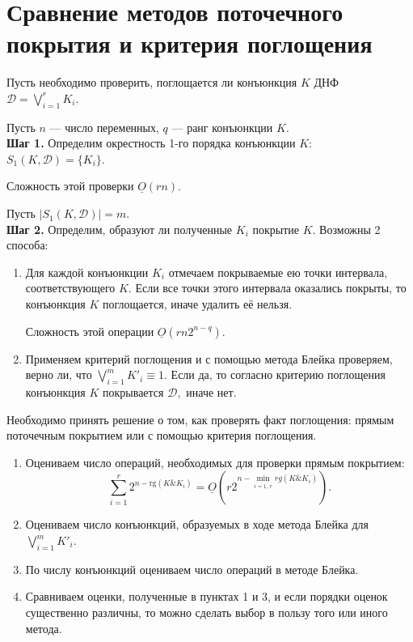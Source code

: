 \documentclass[12pt,a4paper,oneside,fleqn,leqno]{article}
\theoremstyle{definition}
\begin{document}
\section{Сравнение методов поточечного покрытия и критерия поглощения}
		Пусть необходимо проверить, поглощается ли конъюнкция $K$ ДНФ $\mathcal{D} = \bigvee\limits_{i = 1}^r K_i.$\par
		Пусть $n$ --- число переменных, $q$ --- ранг конъюнкции $K.$\\
		\textbf{Шаг 1.} Определим окрестность 1-го порядка конъюнкции $K$: $S_1(K, \mathcal{D}) = \{K_i\}.$\par
		Сложность этой проверки $\underline{O}(rn).$\par
		Пусть $|S_1(K, \mathcal{D})| = m$.\\
		\textbf{Шаг 2.} Определим, образуют ли полученные $K_i$ покрытие $K.$ Возможны 2 способа:\par
		\begin{enumerate}
			\item
			Для каждой конъюнкции $K_i$ отмечаем покрываемые ею точки интервала, соответствующего $K.$ Если все точки этого интервала оказались покрыты, то конъюнкция $K$ поглощается, иначе удалить её нельзя.\par
			Сложность этой операции $\underline{O}(rn2^{n-q})$.
			\item
			Применяем критерий поглощения и с помощью метода Блейка проверяем, верно ли, что $\bigvee\limits_{i = 1}^m K'_i \equiv 1.$ Если да, то согласно критерию поглощения конъюнкция $K$ покрывается $\mathcal{D},$ иначе нет.\par
		\end{enumerate}\par
		Необходимо принять решение о том, как проверять факт поглощения: прямым поточечным покрытием или с помощью критерия поглощения.
		\begin{enumerate}
			\item
			Оцениваем число операций, необходимых для проверки прямым покрытием:
			$$
				\sum_{i = 1}^r 2^{n-\text{rg}(K \& K_i)} = \underline{O}\left(r 2^{n - \min\limits_{i = \overline{1,\,r}}rg(K \& K_i)}\right).
			$$
			\item
			Оцениваем число конъюнкций, образуемых в ходе метода Блейка для $\bigvee\limits_{i = 1}^m K'_i$.
			\item
			По числу конъюнкций оцениваем число операций в методе Блейка.
			\item
			Сравниваем оценки, полученные в пунктах 1 и 3, и если порядки оценок существенно различны, то можно сделать выбор в пользу того или иного метода.
		\end{enumerate}
\end{document}
